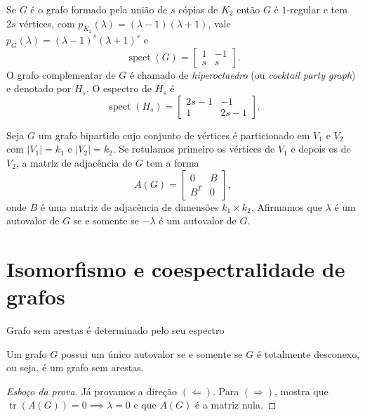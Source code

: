 \documentclass{beamer}
\DeclareMathOperator{\tr}{tr}
\DeclareMathOperator{\spect}{spect}
\begin{document}
\begin{frame}
    \begin{exmp}
        Se \(G\) é o grafo formado pela união de \(s\) cópias de \(K_2\) então \(G\) é \(1\)-regular e tem \(2s\) vértices, com \(p_{K_2} (\lambda) = (\lambda - 1)(\lambda + 1)\), vale \(p_G (\lambda) = (\lambda - 1)^s(\lambda + 1)^s\) e \[ \spect(G) = \begin{bmatrix}
            1 & -1 \\
            s & s
        \end{bmatrix}.\] \pause 
        O grafo complementar de \(G\) é chamado de \emph{hiperoctaedro} (ou \emph{cocktail party graph}) e denotado por \(H_s\). O espectro de \(H_s\) é \[\spect(H_s) = \begin{bmatrix}
            2s-1 & -1 \\
            1 & 2s-1
        \end{bmatrix}.\]
    \end{exmp}
\end{frame}

\begin{frame}
    \begin{exmp}
    Seja \(G\) um grafo bipartido cujo conjunto de vértices é particionado em \(V_1\) e \(V_2\) com \(|V_1| = k_1\) e \(|V_2| = k_2\). Se rotulamos primeiro os vértices de \(V_1\) e depois os de \(V_2\), a matriz de adjacência de \(G\) tem a forma
    \[
        A(G) = \begin{bmatrix}
            0 & B \\
            B^T & 0
        \end{bmatrix},
    \] onde \(B\) é uma matriz de adjacência de dimensões \(k_1 \times k_2\). Afirmamos que \(\lambda\) é um autovalor de \(G\) se e somente se \(-\lambda\) é um autovalor de \(G\).
    \end{exmp}
\end{frame}

\section{Isomorfismo e coespectralidade de grafos}

\begin{frame}{Grafo sem arestas é determinado pelo seu espectro}
    \begin{prop}
        Um grafo \(G\) possui um único autovalor se e somente se \(G\) é totalmente desconexo, ou seja, é um grafo sem arestas.
    \end{prop}
    \begin{proof}[Esboço da prova]
        Já provamos a direção \((\Leftarrow)\). Para \((\Rightarrow)\), mostra que \(\tr(A(G)) = 0 \implies \lambda = 0\) e que \(A(G)\) é a matriz nula.
    \end{proof}
\end{frame}
\end{document}
